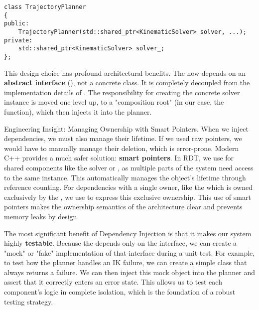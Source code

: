 \begin{verbatim}
class TrajectoryPlanner
{
public:
    TrajectoryPlanner(std::shared_ptr<KinematicSolver> solver, ...);
private:
    std::shared_ptr<KinematicSolver> solver_;
};
\end{verbatim}
\label{lst:conceptual-constructor-di}

This design choice has profound architectural benefits. The  now depends on an \textbf{abstract interface} (), not a concrete class. It is completely decoupled from the implementation details of . The responsibility for creating the concrete solver instance is moved one level up, to a "composition root" (in our case, the  function), which then injects it into the planner.

\begin{tipbox}{Engineering Insight: Managing Ownership with Smart Pointers.}
    When we inject dependencies, we must also manage their lifetime. If we used raw pointers, we would have to manually manage their deletion, which is error-prone. Modern C++ provides a much safer solution: \textbf{smart pointers}. In RDT, we use  for shared components like the solver or , as multiple parts of the system need access to the same instance. This automatically manages the object's lifetime through reference counting. For dependencies with a single owner, like the  which is owned exclusively by the , we use  to express this exclusive ownership. This use of smart pointers makes the ownership semantics of the architecture clear and prevents memory leaks by design.
\end{tipbox}


The most significant benefit of Dependency Injection is that it makes our system highly \textbf{testable}. Because the  depends only on the  interface, we can create a "mock" or "fake" implementation of that interface during a unit test. For example, to test how the planner handles an IK failure, we can create a simple  class that always returns a failure. We can then inject this mock object into the planner and assert that it correctly enters an error state. This allows us to test each component's logic in complete isolation, which is the foundation of a robust testing strategy.

